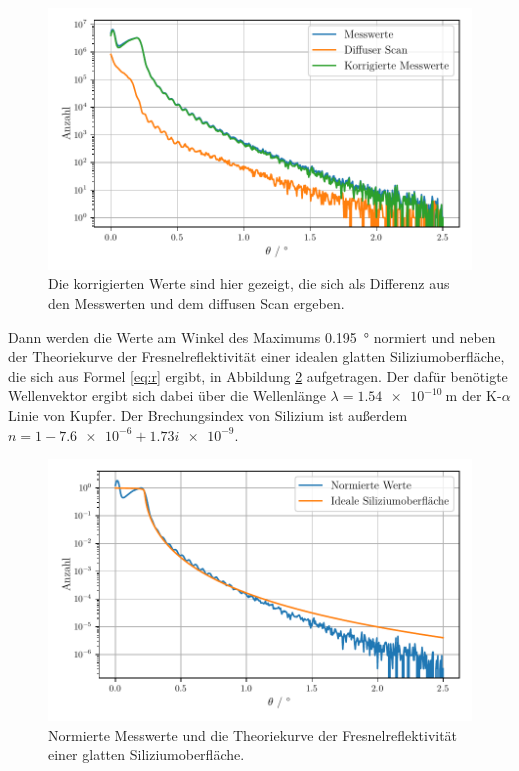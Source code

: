 \begin{figure}
    \centering
    \includegraphics[width=\textwidth]{figures/messwerte_relativ.pdf}
    \caption{Die korrigierten Werte sind hier gezeigt, die sich als Differenz aus den Messwerten und dem diffusen Scan ergeben.}
    \label{abb:diffus}
\end{figure}

Dann werden die Werte am Winkel des Maximums \SI{0.195}{\degree} normiert und neben der Theoriekurve der Fresnelreflektivität einer idealen glatten Siliziumoberfläche, die sich aus Formel \eqref{eq:r} ergibt, in Abbildung \ref{abb:norm} aufgetragen. Der dafür benötigte Wellenvektor ergibt sich dabei über die Wellenlänge $\lambda = \SI{1.54e-10}{\meter}$ der K-$\alpha$ Linie von Kupfer. 
Der Brechungsindex von Silizium ist außerdem $n = \num{1} - \num{7.6e-6} + \num{1.73i e-9}$.
\begin{figure}
    \centering
    \includegraphics[width=\textwidth]{figures/messwerte_norm.pdf}
    \caption{Normierte Messwerte und die Theoriekurve der Fresnelreflektivität einer glatten Siliziumoberfläche.}
    \label{abb:norm}
\end{figure}

